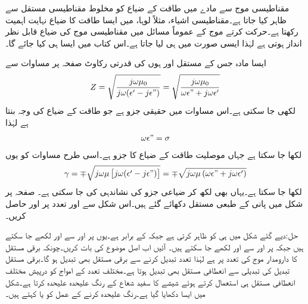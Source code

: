 مقناطیسی موج سے مادے میں طاقت کے ضیاع کو مخلوط مقناطیسی مستقل  سے ظاہر کیا جاتا ہے۔مقناطیسی اشیاء، مثلاً لوہا، میں ایسا طاقت کا ضیاع نہایت اہمیت رکھتا ہے۔حرکت کرتے موج کے عموماً مسائل میں مقناطیسی موج کی ضیاع قابل نظر انداز ہوتی ہے لہٰذا ایسی صورت میں  ہی لیا جاتا ہے۔اس کتاب میں ایسا ہی کیا جائے گا۔

ایسا مادہ جس کے مستقل  اور  ہوں کی قدرتی رکاوٹ صفحہ  پر مساوات  سے
\begin{align}
Z=\sqrt{\frac{j \omega \mu_0}{j \omega (\epsilon'-j\epsilon")}}=\sqrt{\frac{j\omega \mu_0}{\omega \epsilon"+j\omega \epsilon'}}
\end{align}
لکھی جا سکتی ہے۔اس مساوات میں حقیقی جزو  ہے جو طاقت کے ضیاع کی وجہ بنتا ہے لہٰذا 
\begin{align}
\omega \epsilon"=\sigma
\end{align}
لکھا جا سکتا ہے جہاں موصلیت طاقت کے ضیاع کا جزو ہے۔اسی طرح مساوات  کو یوں
\begin{align}
\gamma=\mp \sqrt{j \omega \mu  \left[j \omega (\epsilon'-j\epsilon" )\right]}=\mp \sqrt{j \omega \mu  \left(\omega \epsilon"+j\omega\epsilon' \right)}
\end{align}
لکھا جا سکتا ہے۔یہاں بھی  لکھ کر ضیاعی جزو کی نشاندہی کی جا سکتی ہے۔
صفحہ  پر شکل  میں پانی کے طبعی مستقل دکھائے گئے ہیں۔اس شکل سے  اور  تعدد پر  اور  حاصل کریں۔

حل:دیے گئے شکل میں  ہی  کو ظاہر کرتی ہے جبکہ  کے برابر ہے۔یوں   پر  اور  سے  اور 
لکھے جا سکتے ہیں جبکہ  پر  اور  سے  اور  لکھے جا سکتے ہیں۔
آئیں اب اصل موضوع کی بات کریں۔چونکہ برقی مستقل کا دارومدار موج کی تعدد پر ہے لہٰذا تعدد تبدیل  کرنے سے برقی مستقل بھی تبدیل ہو گا۔برقی مستقل تبدیل کی تبدیلی سے انعطافی مستقل بھی تبدیل ہوتا ہے۔مختلف تعدد کے امواج کو درپیش مختلف انعطافی مستقل ہی استعمال کرتے ہوئے شیشے کا   سفید شعاع کے رنگ علیحدہ علیحدہ کرتا ہے۔شکل  میں ایسا دکھایا گیا ہے۔رنگ علیحدہ کرنے کے عمل کو  یا  کہتے ہیں۔

